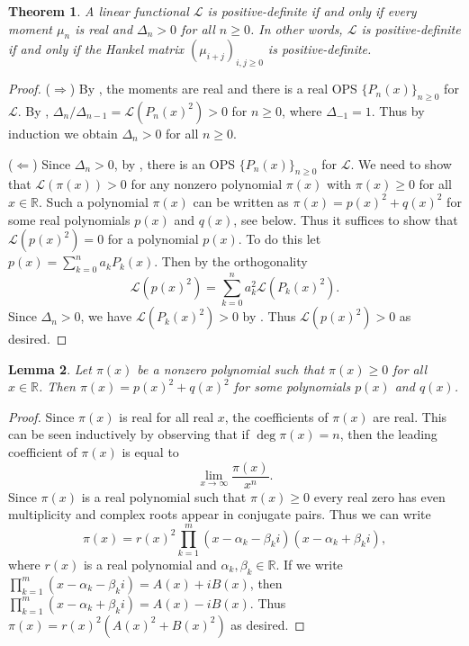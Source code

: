 \documentclass{amsart}
\numberwithin{equation}{section}
\newtheorem{thm}{Theorem}[section]
\newtheorem{lem}[thm]{Lemma}
\theoremstyle{definition}
\newcommand{\RR}{\mathbb{R}}
\newcommand\LL{\mathcal{L}}
\begin{document}
\begin{thm}\label{thm:pos-def-equiv2}
  A linear functional \( \LL \) is positive-definite if and only if
  every moment \( \mu_n \) is real and \( \Delta_n>0 \) for all
  \( n\ge0 \). In other words, \( \LL \) is positive-definite if and
  only if the Hankel matrix \( (\mu_{i+j})_{i,j\ge0} \) is
  positive-definite.
\end{thm}
\begin{proof}
  (\(\Rightarrow\)) By , the moments are real
  and there is a real OPS \( \{ P_n(x) \}_{n\ge 0} \) for \( \LL \).
  By , \( \Delta_n/\Delta_{n-1} = \LL(P_n(x)^2)>0 \)
  for \( n\ge0 \), where \( \Delta_{-1}=1 \).
  Thus by induction we obtain \( \Delta_n>0 \) for all \( n\ge0 \).

  (\(\Leftarrow\)) Since \( \Delta_n>0 \), by , there
  is an OPS \( \{ P_n(x) \}_{n\ge 0} \) for \( \LL \). We need to show
  that \( \LL(\pi(x))>0 \) for any nonzero polynomial \( \pi(x) \)
  with \( \pi(x)\ge0 \) for all \( x\in \RR \). Such a polynomial
  \( \pi(x) \) can be written as \( \pi(x) = p(x)^2 + q(x)^2 \) for
  some real polynomials \( p(x) \) and \( q(x) \), see
   below. Thus it suffices to show that
  \( \LL(p(x)^2) = 0 \) for a polynomial \( p(x) \). To do this let
  \( p(x) = \sum_{k=0}^n a_k P_k(x) \). Then by the orthogonality
  \[
    \LL(p(x)^2) = \sum_{k=0}^n a_k^2 \LL(P_k(x)^2).
  \]
  Since \( \Delta_n>0 \), we have \( \LL(P_k(x)^2)>0 \) by
  . Thus \( \LL(p(x)^2)>0 \) as desired.
\end{proof}

\begin{lem}\label{lem:pi=p2+q2}
  Let \( \pi(x) \) be a nonzero polynomial such that \( \pi(x)\ge0 \)
  for all \( x\in \RR \). Then \( \pi(x) = p(x)^2 + q(x)^2 \) for some
  polynomials \( p(x) \) and \( q(x) \).
\end{lem}
\begin{proof}
  Since \( \pi(x) \) is real for all real \( x \), the coefficients of
  \( \pi(x) \) are real. This can be seen inductively by observing
  that if \( \deg \pi(x) =n \), then the leading coefficient of
  \( \pi(x) \) is equal to
  \[
    \lim_{x\to \infty} \frac{\pi(x)}{x^n}.
  \]
  Since \( \pi(x) \) is a real polynomial such that \( \pi(x)\ge0 \)
  every real zero has even multiplicity and complex roots appear in
  conjugate pairs. Thus we can write
  \[
    \pi(x) = r(x)^2 \prod_{k=1}^{m} (x-\alpha_k-\beta_ki)(x-\alpha_k+\beta_ki),
  \]
  where \( r(x) \) is a real polynomial and
  \( \alpha_k,\beta_k\in \RR \).
  If we write \( \prod_{k=1}^{m} (x-\alpha_k-\beta_ki) = A(x)+iB(x) \),
  then \( \prod_{k=1}^{m} (x-\alpha_k+\beta_ki) = A(x)-iB(x) \).
  Thus \( \pi(x) = r(x)^2(A(x)^2+B(x)^2) \) as desired.
\end{proof}
\end{document}
